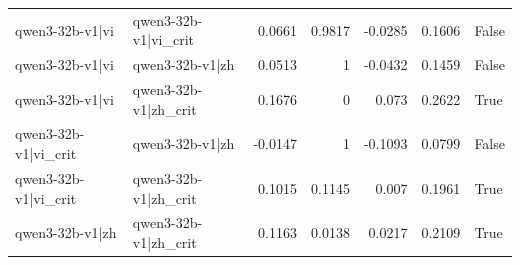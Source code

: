 \begin{table}
\begin{tabular}{l l r r r r l}
qwen3-32b-v1|vi & qwen3-32b-v1|vi_crit & 0.0661 & 0.9817 & -0.0285 & 0.1606 & False \\
qwen3-32b-v1|vi & qwen3-32b-v1|zh & 0.0513 & 1 & -0.0432 & 0.1459 & False \\
qwen3-32b-v1|vi & qwen3-32b-v1|zh_crit & 0.1676 & 0 & 0.073 & 0.2622 & True \\
qwen3-32b-v1|vi_crit & qwen3-32b-v1|zh & -0.0147 & 1 & -0.1093 & 0.0799 & False \\
qwen3-32b-v1|vi_crit & qwen3-32b-v1|zh_crit & 0.1015 & 0.1145 & 0.007 & 0.1961 & True \\
qwen3-32b-v1|zh & qwen3-32b-v1|zh_crit & 0.1163 & 0.0138 & 0.0217 & 0.2109 & True \\
\bottomrule
\end{tabular}
\end{table}

